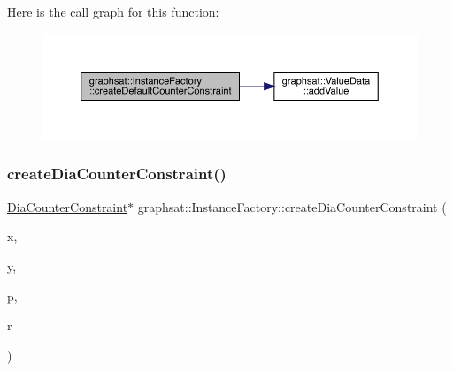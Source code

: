 Here is the call graph for this function\+:
\nopagebreak
\begin{figure}[H]
\begin{center}
\leavevmode
\includegraphics[width=350pt]{classgraphsat_1_1_instance_factory_ac2eb9868107cc51e21a0e698d016267d_cgraph}
\end{center}
\end{figure}
\mbox{\label{classgraphsat_1_1_instance_factory_a3a7fcb2873970201601471c4cdbeeeff}} 
\subsubsection{\texorpdfstring{createDiaCounterConstraint()}{createDiaCounterConstraint()}}
{\footnotesize\ttfamily \mbox{\hyperlink{classgraphsat_1_1_dia_counter_constraint}{Dia\+Counter\+Constraint}}$\ast$ graphsat\+::\+Instance\+Factory\+::create\+Dia\+Counter\+Constraint (\begin{DoxyParamCaption}\item[{int}]{x,  }\item[{int}]{y,  }\item[{\mbox{\hyperlink{namespacegraphsat_acfb5939f9bdafbd9aea0d084b9a56f69}{C\+O\+M\+P\+\_\+\+O\+P\+E\+R\+A\+T\+OR}}}]{p,  }\item[{int}]{r }\end{DoxyParamCaption})\hspace{0.3cm}{\ttfamily [inline]}}

